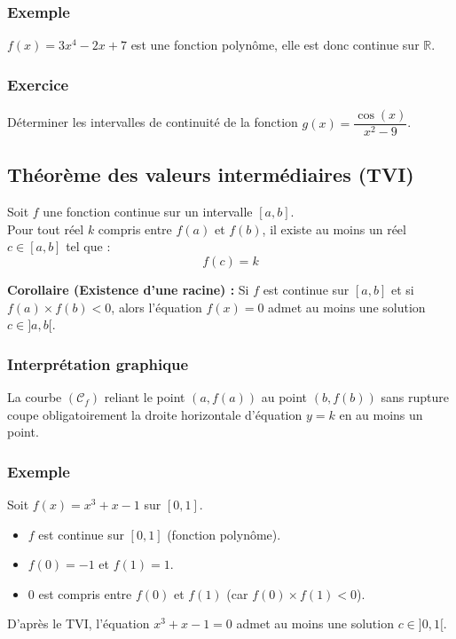 \documentclass[12pt,a4paper]{article}
\begin{document}
\subsubsection*{Exemple}
$f(x) = 3x^4 - 2x + 7$ est une fonction polynôme, elle est donc continue sur $\mathbb{R}$.

\subsubsection*{Exercice}
Déterminer les intervalles de continuité de la fonction $g(x) = \dfrac{\cos(x)}{x^2 - 9}$.

\vspace{0.5cm}
\subsection{Théorème des valeurs intermédiaires (TVI)}

\begin{tcolorbox}[
    colframe=primary,
    colback=boxbg,
    coltitle=white,
    colbacktitle=titlebg,
    fonttitle=\bfseries,
    title=Énoncé du TVI,
    arc=3mm,
    boxrule=1pt
]
Soit $f$ une fonction continue sur un intervalle $[a, b]$.\\
Pour tout réel $k$ compris entre $f(a)$ et $f(b)$, il existe au moins un réel $c \in [a, b]$ tel que :
\[
f(c) = k
\]
\end{tcolorbox}

\noindent\textbf{Corollaire (Existence d'une racine) :} Si $f$ est continue sur $[a, b]$ et si $f(a) \times f(b) < 0$, alors l'équation $f(x) = 0$ admet au moins une solution $c \in ]a, b[$.

\subsubsection*{Interprétation graphique}
La courbe $(\mathcal{C}_f)$ reliant le point $(a, f(a))$ au point $(b, f(b))$ sans rupture coupe obligatoirement la droite horizontale d'équation $y = k$ en au moins un point.

\subsubsection*{Exemple}
Soit $f(x) = x^3 + x - 1$ sur $[0, 1]$.
\begin{itemize}
    \item $f$ est continue sur $[0, 1]$ (fonction polynôme).
    \item $f(0) = -1$ et $f(1) = 1$.
    \item $0$ est compris entre $f(0)$ et $f(1)$ (car $f(0) \times f(1) < 0$).
\end{itemize}
D'après le TVI, l'équation $x^3 + x - 1 = 0$ admet au moins une solution $c \in ]0, 1[$.
\end{document}
